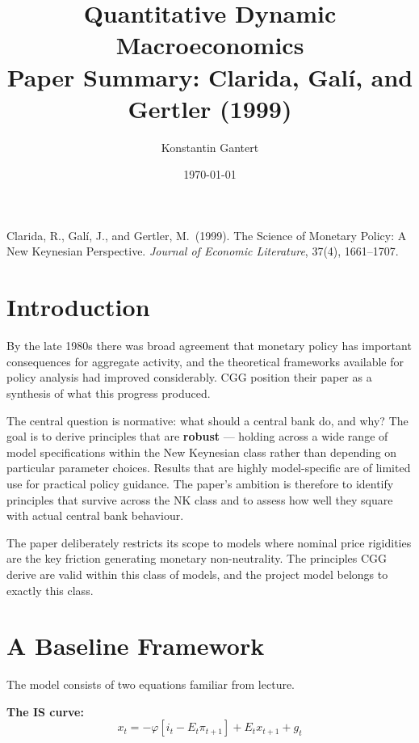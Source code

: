 \documentclass[11pt, a4paper]{article}
\title{\textbf{Quantitative Dynamic Macroeconomics}\\[0.4em]
\large Paper Summary: Clarida, Gal\'{i}, and Gertler (1999)}
\author{Konstantin Gantert}
\date{\today}
\begin{document}
\maketitle

\noindent Clarida, R., Gal\'{i}, J., and Gertler, M.\ (1999). The Science of
Monetary Policy: A New Keynesian Perspective. \textit{Journal of Economic
Literature}, 37(4), 1661--1707.

\tableofcontents
\bigskip

\section{Introduction}

By the late 1980s there was broad agreement that monetary policy has important
consequences for aggregate activity, and the theoretical frameworks available
for policy analysis had improved considerably. CGG position their paper as a
synthesis of what this progress produced.

The central question is normative: what should a central bank do, and why?
The goal is to derive principles that are \textbf{robust} --- holding across
a wide range of model specifications within the New Keynesian class rather
than depending on particular parameter choices. Results that are highly
model-specific are of limited use for practical policy guidance. The paper's
ambition is therefore to identify principles that survive across the NK class
and to assess how well they square with actual central bank behaviour.

The paper deliberately restricts its scope to models where nominal price
rigidities are the key friction generating monetary non-neutrality. The
principles CGG derive are valid within this class of models, and the project
model belongs to exactly this class.

\section{A Baseline Framework}

The model consists of two equations familiar from lecture.

\textbf{The IS curve:}
\begin{equation}
    x_t = -\varphi[i_t - E_t\pi_{t+1}] + E_t x_{t+1} + g_t
\end{equation}
\end{document}

